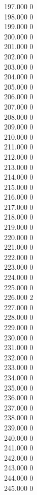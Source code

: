 { 197.000	0 \\
 198.000	0 \\
 199.000	0 \\
 200.000	0 \\
 201.000	0 \\
 202.000	0 \\
 203.000	0 \\
 204.000	0 \\
 205.000	0 \\
 206.000	0 \\
 207.000	0 \\
 208.000	0 \\
 209.000	0 \\
 210.000	0 \\
 211.000	0 \\
 212.000	0 \\
 213.000	0 \\
 214.000	0 \\
 215.000	0 \\
 216.000	0 \\
 217.000	0 \\
 218.000	0 \\
 219.000	0 \\
 220.000	0 \\
 221.000	0 \\
 222.000	0 \\
 223.000	0 \\
 224.000	0 \\
 225.000	0 \\
 226.000	2 \\
 227.000	0 \\
 228.000	0 \\
 229.000	0 \\
 230.000	0 \\
 231.000	0 \\
 232.000	0 \\
 233.000	0 \\
 234.000	0 \\
 235.000	0 \\
 236.000	0 \\
 237.000	0 \\
 238.000	0 \\
 239.000	0 \\
 240.000	0 \\
 241.000	0 \\
 242.000	0 \\
 243.000	0 \\
 244.000	0 \\
 245.000	0 \\
}
